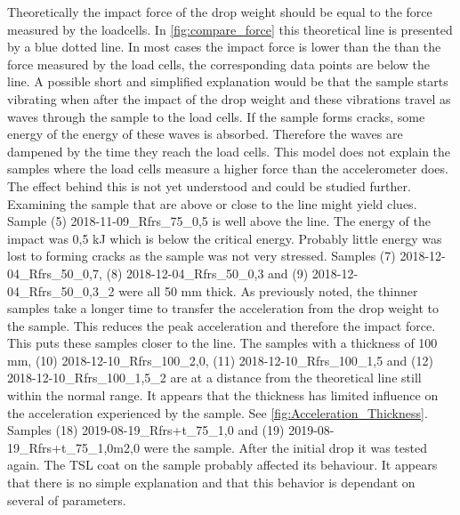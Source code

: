 Theoretically  the impact force of the drop weight should be equal to the force measured by the loadcells. In \autoref{fig:compare_force} this theoretical line is presented by a blue dotted line.
In most cases the impact force is lower than the than the force measured by the load cells, the corresponding data points are below the line. %
A possible short and simplified explanation would be that the sample starts vibrating when after the impact of the drop weight and these vibrations travel as waves through the sample to the load cells. If the sample forms cracks, some energy of the energy of these waves is absorbed. Therefore the waves are dampened by the time they reach the load cells. This model does not explain the samples where the load cells measure a higher force than the accelerometer does. The effect behind this is not yet understood and could be studied further. Examining the sample that are above or close to the line might yield clues. Sample (5) 2018-11-09\_Rfrs\_75\_0,5 is well above the line. The energy of the impact was 0,5 kJ which is below the critical energy. Probably little energy was lost to forming cracks as the sample was not very stressed.
Samples (7) 2018-12-04\_Rfrs\_50\_0,7, (8) 2018-12-04\_Rfrs\_50\_0,3 and (9) 2018-12-04\_Rfrs\_50\_0,3\_2 were all 50 mm thick. As previously noted, the thinner samples take a longer time to transfer the acceleration from the drop weight to the sample. This reduces the peak acceleration and therefore the impact force. This puts these samples closer to the line. The samples with a thickness of 100 mm, (10) 2018-12-10\_Rfrs\_100\_2,0, (11) 2018-12-10\_Rfrs\_100\_1,5	 and (12) 2018-12-10\_Rfrs\_100\_1,5\_2  are at a distance from the theoretical line still within the normal range. It appears that the thickness has limited influence on the acceleration experienced by the sample. See \autoref{fig:Acceleration_Thickness}.
Samples 	(18) 2019-08-19\_Rfrs+t\_75\_1,0 and (19) 2019-08-19\_Rfrs+t\_75\_1,0m2,0  were the sample. After the initial drop it was tested again. The TSL coat on the sample probably affected its behaviour. 
It appears that there is no simple explanation and that this behavior is dependant on several of parameters.


